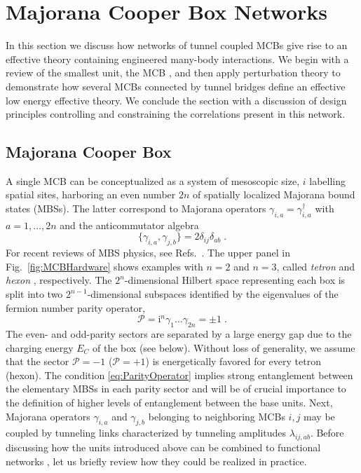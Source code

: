 \documentclass[twocolumn,floats,prx,showpacs]{revtex4-1}
\begin{document}
\section{Majorana Cooper Box Networks}\label{sec2}

In this section we discuss how networks of tunnel coupled MCBs give rise to an effective  theory containing engineered many-body interactions. We begin with a review of the smallest unit, the MCB  \cite{Beri2012,Beri2013,Altland2013,Plugge2017,Karzig2017}, and then apply perturbation theory to demonstrate how several MCBs connected by tunnel bridges define an effective low energy effective theory. We conclude the section with a discussion of design principles controlling and constraining the correlations present in this network.

\subsection{Majorana Cooper Box}\label{sec2a}

A single MCB can be conceptualized as a system of mesoscopic size, $i$ labelling spatial sites, 
harboring an even number $2n$ of spatially localized Majorana bound states (MBSs). The latter correspond to 
Majorana operators $\gamma_{i,a}=\gamma^\dagger_{i,a}$ with $a=1,\dots,2n$ and  the anticommutator algebra 
\begin{equation}
\{ \gamma_{i,a},\gamma_{j,b}\}=2\delta_{ij}\delta_{ab}\; . 
\end{equation}
For recent reviews of MBS physics, see Refs.~\cite{Alicea2012,Leijnse2012,Beenakker2013,Sarma2015,Aguado2017,Lutchyn2018}.  
The upper panel in Fig.~\ref{fig:MCBHardware} shows examples with $n=2$ and $n=3$, called \emph{tetron} and \emph{hexon} \cite{Karzig2017}, respectively.   The $2^n$-dimensional Hilbert space representing each box is split into two $2^{n-1}$-dimensional subspaces identified by the eigenvalues of the fermion number parity operator,
\begin{equation}
\label{eq:ParityOperator}
\mathcal P =  \mathrm i ^n\gamma_1 \ldots \gamma_{2n}=\pm 1\;.
\end{equation}
The even- and odd-parity sectors are separated by a large energy gap due to the charging energy $E_C$ of the box (see below).  Without loss of generality, we assume that the sector $\mathcal{P}=-1$ ($\mathcal P=+1$) is energetically favored for every tetron (hexon). The condition \eqref{eq:ParityOperator} implies strong entanglement between the elementary MBSs in each parity sector and will be of crucial importance to the definition of higher levels of entanglement between the base units. Next, Majorana operators $\gamma_{i,a}$ and $\gamma_{j,b}$ belonging to neighboring MCBs $i,j$ may be coupled by tunneling links characterized by tunneling amplitudes $\lambda_{ij,ab}$. 
Before discussing how the units introduced above can be combined to functional networks   \cite{PhysRevB.94.174514,Xu2010,PhysRevLett.108.260504,Roy2017,Nussinov2012,Vijay2015,Vijay2016,Litinski2017}, 
let us briefly review how they could be realized in practice.
\end{document}
